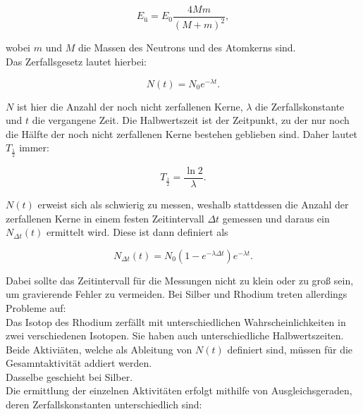 \begin{equation}
    E_ü = E_0 \frac{4Mm}{(M+m)^2},
\end{equation}

wobei \(m\) und \(M\) die Massen des Neutrons und des Atomkerns sind.\\
Das Zerfallsgesetz lautet hierbei:

\begin{equation}
    N(t) = N_0 e^{-\lambda t}.
\end{equation}

\(N\) ist hier die Anzahl der noch nicht zerfallenen Kerne, \(\lambda\) die Zerfallskonstante und \(t\) die vergangene Zeit. Die Halbwertszeit ist der Zeitpunkt, zu der nur noch die Hälfte der noch nicht zerfallenen Kerne bestehen geblieben sind. Daher lautet \(T_{\frac{1}{2}}\) immer:

\begin{equation}
    T_{\frac{1}{2}} = \frac{\ln{2}}{\lambda}.
\end{equation}

\(N(t)\) erweist sich als schwierig zu messen, weshalb stattdessen die Anzahl der zerfallenen Kerne in einem festen Zeitintervall \(\Delta t\) gemessen und daraus ein \(N_{\Delta t}(t)\) ermittelt wird. Diese ist dann definiert als

\begin{equation}
    N_{\Delta t}(t) = N_0(1-e^{-\lambda \Delta t})e^{-\lambda t}.
\end{equation}

Dabei sollte das Zeitintervall für die Messungen nicht zu klein oder zu groß sein, um gravierende Fehler zu vermeiden. Bei Silber und Rhodium treten allerdings Probleme auf:\\
Das Isotop des Rhodium zerfällt mit unterschiedlichen Wahrscheinlichkeiten in zwei verschiedenen Isotopen. Sie haben auch unterschiedliche Halbwertszeiten. Beide Aktiviäten, welche als Ableitung von \(N(t)\) definiert sind, müssen für die Gesamntaktivität addiert werden.\\
Dasselbe geschieht bei Silber.\\
Die ermittlung der einzelnen Aktivitäten erfolgt mithilfe von Ausgleichsgeraden, deren Zerfallskonstanten unterschiedlich sind:

